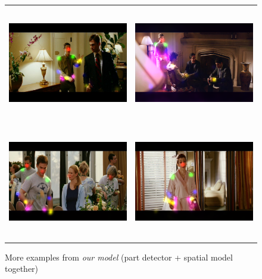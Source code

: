 \documentclass[a4paper,10pt]{article}
\begin{document}
\begin{figure}[H]
\begin{tabular}{cc}
			\includegraphics[height=5cm]{img/ap_sm5.png} & 
			\includegraphics[height=5cm]{img/ap_sm6.png} \\
			\includegraphics[height=5cm]{img/ap_sm7.png} &
			\includegraphics[height=5cm]{img/ap_sm8.png}
			\caption{More examples from \textit{our model} (part detector + spatial model together)}
			\label{appendix}
		\end{tabular}
	\end{figure}
	
\end{document}
